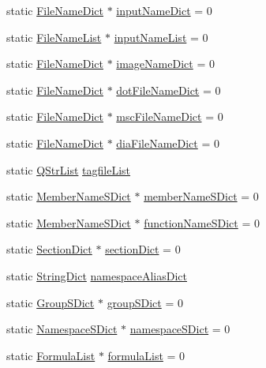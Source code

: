 \begin{DoxyCompactItemize}
static \hyperlink{class_file_name_dict}{File\+Name\+Dict} $\ast$ \hyperlink{class_doxygen_aa61af9a449c28ad9669d95c5216bc0dd}{input\+Name\+Dict} = 0
\item 
static \hyperlink{class_file_name_list}{File\+Name\+List} $\ast$ \hyperlink{class_doxygen_aae6617a2ee925fd82d21621784508c16}{input\+Name\+List} = 0
\item 
static \hyperlink{class_file_name_dict}{File\+Name\+Dict} $\ast$ \hyperlink{class_doxygen_a24c9e83b9998ca9b36adb03e66b924ea}{image\+Name\+Dict} = 0
\item 
static \hyperlink{class_file_name_dict}{File\+Name\+Dict} $\ast$ \hyperlink{class_doxygen_a77302c2351d661d6be1cf6e25a12b9f9}{dot\+File\+Name\+Dict} = 0
\item 
static \hyperlink{class_file_name_dict}{File\+Name\+Dict} $\ast$ \hyperlink{class_doxygen_a6404daceb4b72823e5745fe4a2d4129d}{msc\+File\+Name\+Dict} = 0
\item 
static \hyperlink{class_file_name_dict}{File\+Name\+Dict} $\ast$ \hyperlink{class_doxygen_a98e71a5b297061b43e3e247a18bd2dd4}{dia\+File\+Name\+Dict} = 0
\item 
static \hyperlink{class_q_str_list}{Q\+Str\+List} \hyperlink{class_doxygen_ac397d1829788d1ed990f7a240fe28a7c}{tagfile\+List}
\item 
static \hyperlink{class_member_name_s_dict}{Member\+Name\+S\+Dict} $\ast$ \hyperlink{class_doxygen_ac75eb04ae261400f216eb827dd8b2180}{member\+Name\+S\+Dict} = 0
\item 
static \hyperlink{class_member_name_s_dict}{Member\+Name\+S\+Dict} $\ast$ \hyperlink{class_doxygen_a92d3467a1bfaf71ef47a7fd55370d225}{function\+Name\+S\+Dict} = 0
\item 
static \hyperlink{class_section_dict}{Section\+Dict} $\ast$ \hyperlink{class_doxygen_a11ca62448704d211a405166d73337113}{section\+Dict} = 0
\item 
static \hyperlink{class_string_dict}{String\+Dict} \hyperlink{class_doxygen_af8d5f506cba2c63d6ce05df4ff878058}{namespace\+Alias\+Dict}
\item 
static \hyperlink{class_group_s_dict}{Group\+S\+Dict} $\ast$ \hyperlink{class_doxygen_ac4ba7650052c59ebd8a988c72947ae4c}{group\+S\+Dict} = 0
\item 
static \hyperlink{class_namespace_s_dict}{Namespace\+S\+Dict} $\ast$ \hyperlink{class_doxygen_af274fccf04128e815fd52f633ee1dd03}{namespace\+S\+Dict} = 0
\item 
static \hyperlink{class_formula_list}{Formula\+List} $\ast$ \hyperlink{class_doxygen_aa06b1a63729d23c453ecda852f96bead}{formula\+List} = 0

\end{DoxyCompactItemize}
